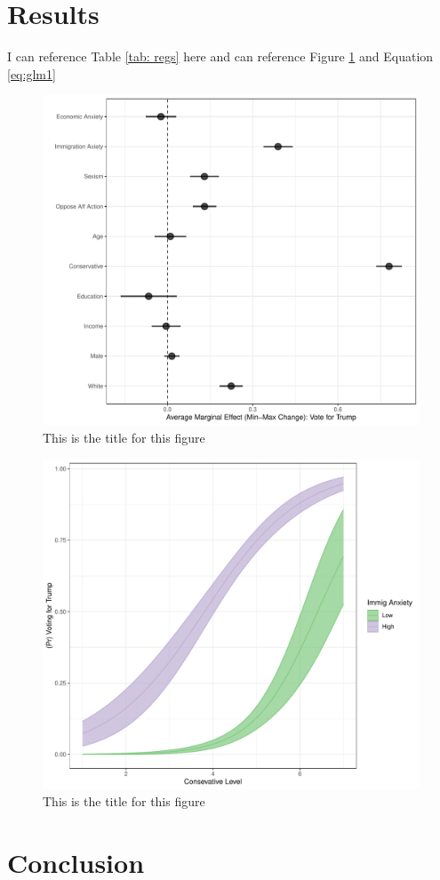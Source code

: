 \documentclass{article}
\begin{document}
\lipsum[5]



\section{Results}

\lipsum[2]

I can reference Table \ref{tab: regs} here and can reference Figure \ref{fig: ame} and Equation \ref{eq:glm1}




\lipsum[5-6]


\begin{figure}
\centering
\caption{This is the title for this figure}
\label{fig: ame}
\includegraphics[scale=.6]{ame_plot}
\end{figure}

\lipsum[5]


\begin{figure}
\centering
\caption{This is the title for this figure}
\label{fig: preds}
\includegraphics[scale=.6]{preds}
\end{figure}

\lipsum[8]

\section{Conclusion}

\lipsum[20-22]
\end{document}
